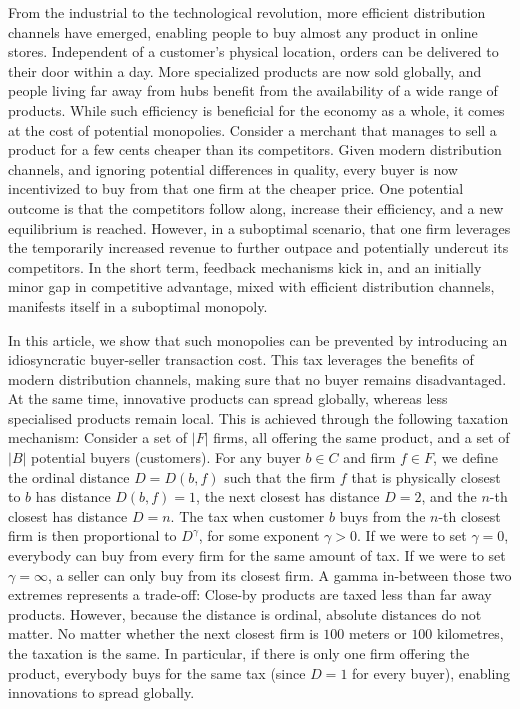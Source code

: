 \documentclass[final,3p,times,authoryear,12pt]{elsarticle}
\begin{document}
From the industrial to the technological revolution, more efficient
distribution channels have emerged, enabling people to buy almost any product
in online stores.  Independent of a customer's physical location, orders can be
delivered to their door within a day.  More specialized products are now sold
globally, and people living far away from hubs benefit from the availability of
a wide range of products.  While such efficiency is beneficial for the economy
as a whole, it comes at the cost of potential monopolies.  Consider a merchant
that manages to sell a product for a few cents cheaper than its competitors. 
Given modern distribution channels, and ignoring potential differences in
quality, every buyer is now incentivized to buy from that one firm at the
cheaper price. One potential outcome is that the competitors follow along,
increase their efficiency, and a new equilibrium is reached.  However, in a
suboptimal scenario, that one firm leverages the temporarily increased revenue
to further outpace and potentially undercut its competitors.  In the short
term, feedback mechanisms kick in, and an initially minor gap in competitive
advantage, mixed with efficient distribution channels, manifests itself in a suboptimal monopoly. 

In this article, we show that such monopolies can be prevented by introducing an idiosyncratic buyer-seller transaction cost.
This tax leverages the benefits of modern distribution channels, making sure that no buyer remains disadvantaged. 
At the same time, innovative products can spread globally, whereas less specialised products remain local. 
This is achieved through the following taxation mechanism: 
Consider a set of $|F|$ firms, all offering the same product, and a set of $|B|$ potential buyers (customers). 
For any buyer $b \in C$ and firm $f \in F$, we define the ordinal distance $D = D(b,f)$ such that the firm $f$ that is physically closest to $b$ has distance $D(b,f)=1$, the next closest has distance $D=2$, and the $n$-th closest has distance $D=n$. 
The tax when customer $b$ buys from the $n$-th closest firm is then proportional to $D^\gamma$, for some exponent $\gamma > 0$. 
If we were to set $\gamma = 0$, everybody can buy from every firm for the same amount of tax. 
If we were to set $\gamma=\infty$, a seller can only buy from its closest firm.
A gamma in-between those two extremes represents a trade-off: 
Close-by products are taxed less than far away products. 
However, because the distance is ordinal, absolute distances do not matter. 
No matter whether the next closest firm is $100$ meters or $100$ kilometres, the taxation is the same. 
In particular, if there is only one firm offering the product, everybody buys for the same tax (since $D=1$ for every buyer), enabling innovations to spread globally.  
\end{document}
